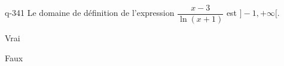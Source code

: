 \begin{truefalse}{q-341}
Le domaine de définition de l'expression $\dfrac{x-3}{\ln(x+1)}$ est $]-1,+\infty[$.
\item Vrai
\item* Faux
\end{truefalse}

